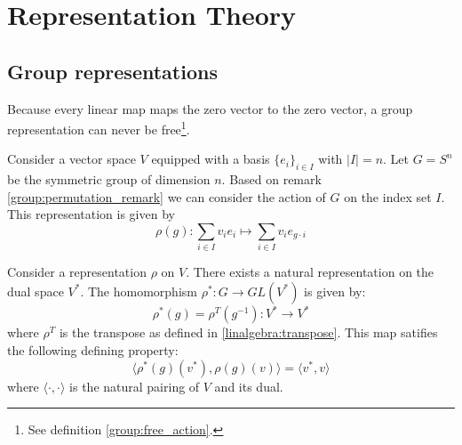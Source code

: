 \chapter{Representation Theory}

\section{Group representations}
    	
    	\begin{property}
    		Because every linear map maps the zero vector to the zero vector, a group representation can never be free\footnote{See definition \ref{group:free_action}.}.
    	\end{property}

        
	\begin{example}
		Consider a vector space $V$ equipped with a basis $\{e_i\}_{i\in I}$ with $|I| = n$. Let $G = S^n$ be the symmetric group of dimension $n$. Based on remark \ref{group:permutation_remark} we can consider the action of $G$ on the index set $I$. This representation is given by
		\begin{equation}
			\rho(g):\sum_{i\in I}v_ie_i\mapsto\sum_{i\in I}v_ie_{g\cdot i}
		\end{equation}
	\end{example}
        
        \begin{example}
        	Consider a representation $\rho$ on $V$. There exists a natural representation on the dual space $V^*$. The homomorphism $\rho^*:G\rightarrow GL(V^*)$ is given by:
            \begin{equation}
            	\rho^*(g) = \rho^T(g^{-1}): V^*\rightarrow V^*
            \end{equation}
            where $\rho^T$ is the transpose as defined in \ref{linalgebra:transpose}. This map satifies the following defining property:
            \begin{equation}
            	\Big\langle\rho^*(g)(v^*), \rho(g)(v)\Big\rangle = \langle v^*, v\rangle
            \end{equation}
            where $\langle\cdot,\cdot\rangle$ is the natural pairing of $V$ and its dual.
        \end{example}
        
